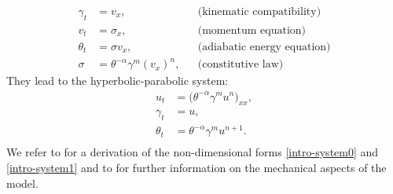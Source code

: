 \documentclass[a4paper,11pt]{article}
\theoremstyle{remark}
\begin{document}
\begin{equation} \label{intro-system0}
\begin{aligned}
 \gamma_t &= v_x, && \text{(kinematic compatibility)} \\	%
 v_t &= \sigma_x, && \text{(momentum equation)} 	\\%
 \theta_t &= \sigma v_x, && \text{(adiabatic energy equation)}	\\%
\sigma &= \theta^{-\alpha}\gamma^m (v_x)^n,&& \text{(constitutive law)}				%
\end{aligned}
\end{equation}
They lead to the hyperbolic-parabolic system:
\begin{equation} 
\label{intro-system1}
\begin{aligned}
u_t &= \big ( \theta^{-\alpha}\gamma^m u^n \big )_{xx} , \\%
 \gamma_t &= u,\\%
 \theta_t &= \theta^{-\alpha}\gamma^m u^{n+1} .\\%
\end{aligned}
\end{equation}
We refer to \cite{KT09} for a derivation of the non-dimensional forms \eqref{intro-system0} and \eqref{intro-system1} and to \cite{clifton_rev_1990,shawki_shear_1989,wright_survey_2002} for further information on the mechanical aspects
of the model.
\end{document}
